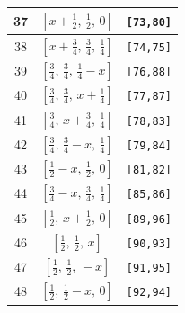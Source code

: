 \documentclass[fleqn,8pt]{jsarticle}
\begin{document}
\begin{longtable}{ccc}
37 & $\left[ x + \frac{1}{2},\, \frac{1}{2},\, 0 \right]$ & {\tt [73,80]} \\ \hline
38 & $\left[ x + \frac{3}{4},\, \frac{3}{4},\, \frac{1}{4} \right]$ & {\tt [74,75]} \\ \hline
39 & $\left[ \frac{3}{4},\, \frac{3}{4},\, \frac{1}{4} - x \right]$ & {\tt [76,88]} \\ \hline
40 & $\left[ \frac{3}{4},\, \frac{3}{4},\, x + \frac{1}{4} \right]$ & {\tt [77,87]} \\ \hline
41 & $\left[ \frac{3}{4},\, x + \frac{3}{4},\, \frac{1}{4} \right]$ & {\tt [78,83]} \\ \hline
42 & $\left[ \frac{3}{4},\, \frac{3}{4} - x,\, \frac{1}{4} \right]$ & {\tt [79,84]} \\ \hline
43 & $\left[ \frac{1}{2} - x,\, \frac{1}{2},\, 0 \right]$ & {\tt [81,82]} \\ \hline
44 & $\left[ \frac{3}{4} - x,\, \frac{3}{4},\, \frac{1}{4} \right]$ & {\tt [85,86]} \\ \hline
45 & $\left[ \frac{1}{2},\, x + \frac{1}{2},\, 0 \right]$ & {\tt [89,96]} \\ \hline
46 & $\left[ \frac{1}{2},\, \frac{1}{2},\, x \right]$ & {\tt [90,93]} \\ \hline
47 & $\left[ \frac{1}{2},\, \frac{1}{2},\, - x \right]$ & {\tt [91,95]} \\ \hline
48 & $\left[ \frac{1}{2},\, \frac{1}{2} - x,\, 0 \right]$ & {\tt [92,94]} \\
\end{longtable}
\renewcommand{\arraystretch}{1.2}
\end{document}
